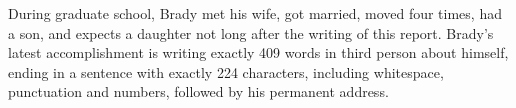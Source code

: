 During graduate school, Brady met his wife, got married, moved four 
times, had a son, and expects a daughter not long after the writing of this report.
Brady's latest accomplishment is writing exactly 409 words in third person about himself, 
ending in a sentence with exactly 224 characters, including whitespace, punctuation 
and numbers, followed by his permanent address.
%
